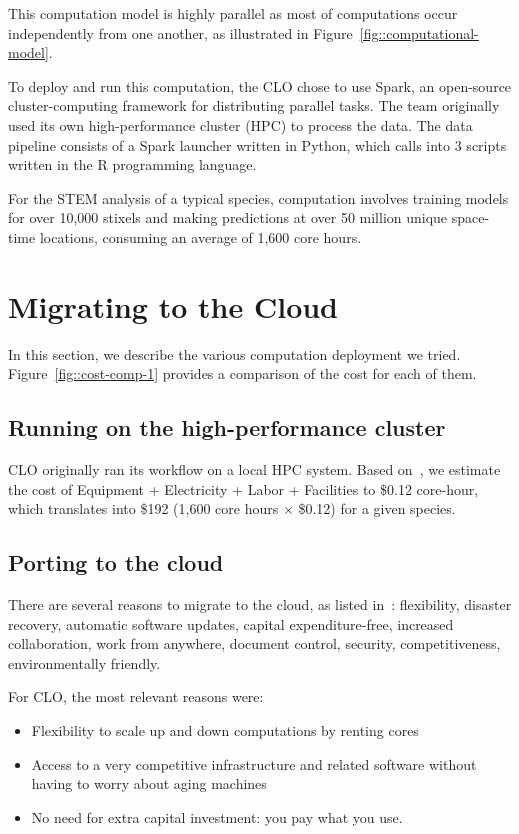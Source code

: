 \documentclass{acm_proc_article-sp}
\begin{document}
This computation model is highly parallel as most of computations occur independently from one another, as illustrated in Figure~\ref{fig::computational-model}.

To deploy and run this computation, the CLO chose to use Spark, an open-source cluster-computing framework for distributing parallel tasks. The team originally used its own high-performance cluster (HPC) to process the data. The data pipeline consists of a Spark launcher written in Python, which calls into 3 scripts written in the R programming language. 

For the STEM analysis of a typical species,  computation involves training models for over 10,000 stixels and making predictions at over 50 million unique space-time locations, consuming an average of 1,600 core hours.

\section{Migrating to the Cloud}\label{sec::migration}
In this section, we describe the various computation deployment we tried. Figure~\ref{fig::cost-comp-1} provides a comparison of the cost for each of them.

\subsection{Running on the high-performance cluster}
CLO originally ran its workflow on a local HPC system. Based on~\cite{Spagnuolo_undated-ih}, we estimate the cost of Equipment + Electricity + Labor + Facilities to \$0.12 core-hour, which translates into \$192 (1,600 core hours $\times$ \$0.12) for a given species.

\subsection{Porting to the cloud}
There are several reasons to migrate to the cloud, as listed in~\cite{noauthor_undated-ne}: flexibility, disaster recovery, automatic software updates, capital expenditure-free, increased collaboration, work from anywhere, document control, security, competitiveness, environmentally friendly.

For CLO, the most relevant reasons were:
\begin{itemize}[noitemsep, topsep=-5pt]
\item Flexibility to scale up and down computations by renting cores 
\item Access to a very competitive infrastructure and related software without having to worry about aging machines
\item No need for extra capital investment: you pay what you use.
\end{itemize}
\end{document}
